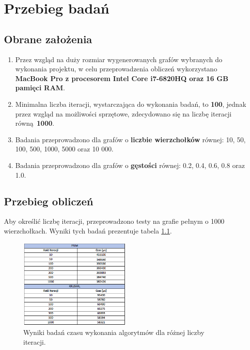 \chapter{Przebieg badań}
\fancyhead[L]{}
\fancyhead[R]{}

\section{Obrane założenia}
\begin{enumerate}
	\item Przez wzgląd na duży rozmiar wygenerowanych grafów wybranych do wykonania projektu, w celu przeprowadzenia obliczeń wykorzystano\textbf{ MacBook Pro z procesorem  Intel Core i7-6820HQ oraz 16 GB pamięci RAM}.
	\item Minimalna liczba iteracji, wystarczająca do wykonania badań, to \textbf{100}, jednak przez wzgląd na możliwości sprzętowe, zdecydowano się na liczbę iteracji równą \textbf{1000}.
	\item Badania przeprowadzono dla grafów o \textbf{liczbie wierzchołków} równej: 10, 50, 100, 500, 1000, 5000 oraz 10 000.
	\item Badania przeprowadzono dla grafów o \textbf{gęstości} równej: 0.2, 0.4, 0.6, 0.8 oraz 1.0.
\end{enumerate}

\newpage
\section{Przebieg obliczeń}
Aby określić liczbę iteracji, przeprowadzono testy na grafie pełnym o 1000 wierzchołkach. Wyniki tych badań prezentuje tabela \ref{fig: tab1}.

\begin{figure}[htb!]
	\centering
	\includegraphics[width=0.5\textwidth]{tex/fig/tab1}
	\caption{Wyniki badań czasu wykonania algorytmów dla różnej liczby iteracji.}
	\label{fig: tab1}
\end{figure}

